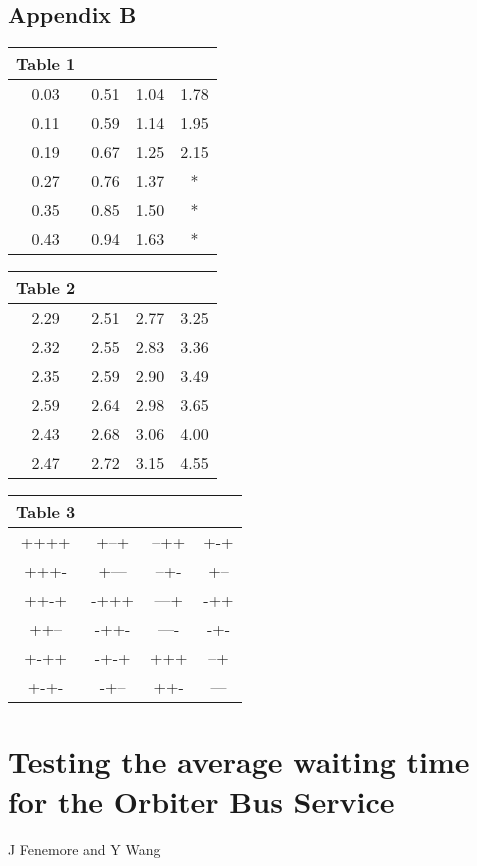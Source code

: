 \subsection*{Appendix B}
\begin{center}
{\scriptsize
\begin{tabular}{|cccc|}\hline
Table 1&&&\\\hline
0.03&	0.51&	1.04&	1.78\\
0.11&	0.59&	1.14&	1.95\\
0.19&	0.67&	1.25&	2.15\\
0.27&	0.76&	1.37&	*\\
0.35&	0.85&	1.50&	*\\
0.43&	0.94&	1.63&	*\\ \hline
\end{tabular}
\begin{tabular}{|cccc|}\hline
Table 2&&&\\\hline
2.29&	2.51&	2.77&	3.25\\
2.32&	2.55&	2.83&	3.36\\
2.35&	2.59&	2.90&	3.49\\
2.59&	2.64&	2.98&	3.65\\
2.43&	2.68&	3.06&	4.00\\
2.47&	2.72&	3.15&	4.55\\ \hline
\end{tabular}
\begin{tabular}{|cccc|}\hline
Table 3&&&\\\hline
++++&	+--+&	--++&	+-+\\
+++-&	+---&	--+-&	+--\\
++-+&	-+++&	---+&	-++\\
++--&	-++-&	----&	-+-\\
+-++&	-+-+&	+++&	--+\\
+-+-&	-+--&	++-&	---\\ \hline
\end{tabular}
}
\end{center}
\newpage
\section{Testing the average waiting time for the Orbiter Bus Service}
\begin{center}
J Fenemore and Y Wang
\end{center}


